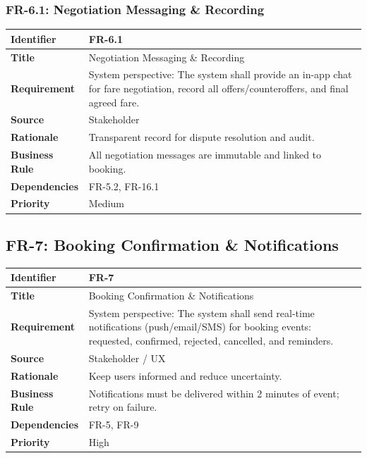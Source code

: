 \subsubsection{FR-6.1: Negotiation Messaging \& Recording}

\begin{longtable}{|p{3cm}|p{12cm}|}
\hline
\rowcolor{lightgray!30}
\textbf{Identifier} & FR-6.1 \\
\hline
\textbf{Title} & Negotiation Messaging \& Recording \\
\hline
\textbf{Requirement} & System perspective: The system shall provide an in-app chat for fare negotiation, record all offers/counteroffers, and final agreed fare. \\
\hline
\textbf{Source} & Stakeholder \\
\hline
\textbf{Rationale} & Transparent record for dispute resolution and audit. \\
\hline
\textbf{Business Rule} & All negotiation messages are immutable and linked to booking. \\
\hline
\textbf{Dependencies} & FR-5.2, FR-16.1 \\
\hline
\textbf{Priority} & Medium \\
\hline
\end{longtable}

\subsection{FR-7: Booking Confirmation \& Notifications}

\begin{longtable}{|p{3cm}|p{12cm}|}
\hline
\rowcolor{lightgray!30}
\textbf{Identifier} & FR-7 \\
\hline
\textbf{Title} & Booking Confirmation \& Notifications \\
\hline
\textbf{Requirement} & System perspective: The system shall send real-time notifications (push/email/SMS) for booking events: requested, confirmed, rejected, cancelled, and reminders. \\
\hline
\textbf{Source} & Stakeholder / UX \\
\hline
\textbf{Rationale} & Keep users informed and reduce uncertainty. \\
\hline
\textbf{Business Rule} & Notifications must be delivered within 2 minutes of event; retry on failure. \\
\hline
\textbf{Dependencies} & FR-5, FR-9 \\
\hline
\textbf{Priority} & High \\
\hline
\end{longtable}

